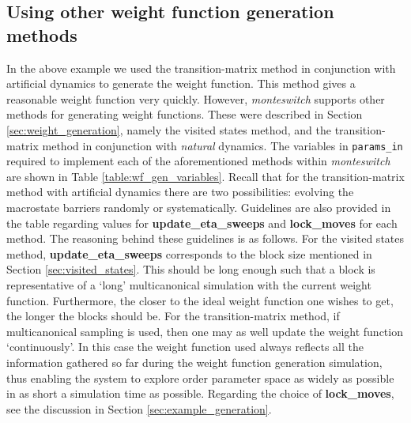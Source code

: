 \documentclass{report}
\begin{document}
\subsection{Using other weight function generation methods}
In the above example we used the transition-matrix method in conjunction with artificial dynamics to generate the weight function. This method gives a 
reasonable weight function very quickly. However, \emph{monteswitch} supports other methods for generating weight functions. These were described in 
Section \ref{sec:weight_generation}, namely the visited states method, and the transition-matrix method in conjunction with \emph{natural} dynamics.
The variables in \texttt{params\_in} required to implement each of the aforementioned methods within \emph{monteswitch} are shown in Table 
\ref{table:wf_gen_variables}. Recall that for the transition-matrix method with artificial dynamics there are two possibilities: evolving the
macrostate barriers randomly or systematically.
Guidelines are also provided in the table regarding values for \textbf{update\_eta\_sweeps} and
\textbf{lock\_moves} for each method. The reasoning behind these guidelines is as follows. 
For the visited states method, \textbf{update\_eta\_sweeps} corresponds to the block size mentioned in
Section \ref{sec:visited_states}. This should be long enough such that a block is representative of a `long' multicanonical simulation with the 
current weight function. Furthermore, the closer to the ideal weight function one wishes to get, the longer the blocks should be.
For the transition-matrix method, if multicanonical sampling is used, then one may as well update the weight function `continuously'. In this case
the weight function used always reflects all the information gathered so far during the weight function generation simulation, thus enabling the
system to explore order parameter space as widely as possible in as short a simulation time as possible. Regarding the choice of
\textbf{lock\_moves}, see the discussion in Section \ref{sec:example_generation}.
\end{document}
